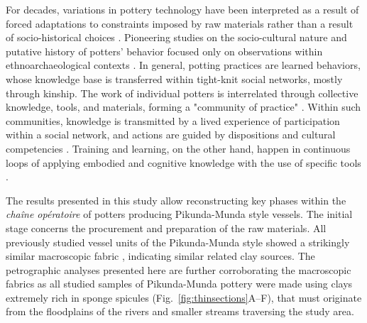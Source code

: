 \documentclass[smallextended,natbib]{svjour3}       %
\begin{document}
For decades, variations in pottery technology have been interpreted as a result of forced adaptations to constraints imposed by raw materials rather than a result of socio-historical choices \citep[6]{Gosselain.2018}. Pioneering studies on the socio-cultural nature and putative history of potters' behavior focused only on observations within ethnoarchaeological contexts \citep{Lechtman.1977}. In general, potting practices are learned behaviors, whose knowledge base is transferred within tight-knit social networks, mostly through kinship. The work of individual potters is interrelated through collective knowledge, tools, and materials, forming a "community of practice" \citep{Wenger.1998,Roddick.2016}. Within such communities, knowledge is transmitted by a lived experience of participation within a social network, and actions are guided by dispositions and cultural competencies \citep{Heitz.2017a}. Training and learning, on the other hand, happen in continuous loops of applying embodied and cognitive knowledge with the use of specific tools \citep{Kuijpers.2018a}.

The results presented in this study allow reconstructing key phases within the \textit{chaîne opératoire} of potters producing Pikunda-Munda style vessels. The initial stage concerns the procurement and preparation of the raw materials. All previously studied vessel units of the Pikunda-Munda style \citep[114--120]{Seidensticker.2021e} showed a strikingly similar macroscopic fabric \citep[62 Tab.~11,69 Tab.~12]{Seidensticker.2021e}, indicating similar related clay sources. The petrographic analyses presented here are further corroborating the macroscopic fabrics as all studied samples of Pikunda-Munda pottery were made using clays extremely rich in sponge spicules (Fig.~\ref{fig:thinsections}A--F), that must originate from the floodplains of the rivers and smaller streams traversing the study area.
\end{document}
